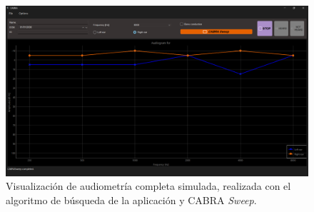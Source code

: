 \begin{figure}[H]
    \centering
    \includegraphics[width=1\linewidth]{figuras/UI-complete-study.png}
    \caption{Visualización de audiometría completa simulada, realizada con el algoritmo de búsqueda de la aplicación y CABRA \textit{Sweep}.}
    \label{fig:UI-complete-study}
\end{figure}